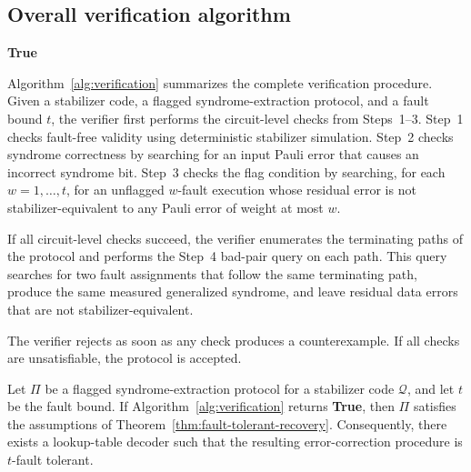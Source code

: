\documentclass[acmsmall,screen,review,anonymous,nonacm]{acmart}
\begin{document}
\subsection{Overall verification algorithm}
\begin{algorithm}[t]
\DontPrintSemicolon
\SetAlgoLined
\caption{SAT-Based Verification of a Flagged Syndrome-Extraction Protocol}
\label{alg:verification}




\Return \textbf{True}
\end{algorithm}

Algorithm~\ref{alg:verification} summarizes the complete verification procedure. Given a stabilizer code, a flagged syndrome-extraction protocol, and a fault bound \(t\), the verifier first performs the circuit-level checks from Steps~1--3. Step~1 checks fault-free validity using deterministic stabilizer simulation. Step~2 checks syndrome correctness by searching for an input Pauli error that causes an incorrect syndrome bit. Step~3 checks the flag condition by searching, for each \(w=1,\ldots,t\), for an unflagged \(w\)-fault execution whose residual error is not stabilizer-equivalent to any Pauli error of weight at most \(w\).

If all circuit-level checks succeed, the verifier enumerates the terminating paths of the protocol and performs the Step~4 bad-pair query on each path. This query searches for two fault assignments that follow the same terminating path, produce the same measured generalized syndrome, and leave residual data errors that are not stabilizer-equivalent.

The verifier rejects as soon as any check produces a counterexample. If all checks are unsatisfiable, the protocol is accepted.

\begin{theorem}
\label{thm:verification-correctness}
Let \(\Pi\) be a flagged syndrome-extraction protocol for a stabilizer code \(\mathcal Q\), and let \(t\) be the fault bound. If Algorithm~\ref{alg:verification} returns \textbf{True}, then \(\Pi\) satisfies the assumptions of Theorem~\ref{thm:fault-tolerant-recovery}. Consequently, there exists a lookup-table decoder such that the resulting error-correction procedure is \(t\)-fault tolerant.
\end{theorem}
\end{document}
